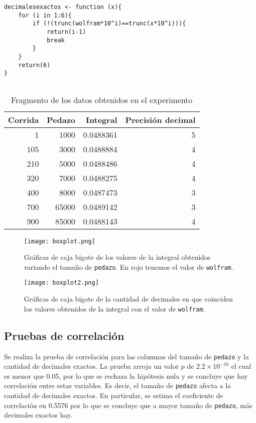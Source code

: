 \documentclass[12pt,letterpaper]{article}
\begin{document}
\begin{lstlisting}[label=lst:gc1,caption=Función \texttt{decimalesexactos}., frame = single]
decimalesexactos <- function (x){
    for (i in 1:6){
        if (!(trunc(wolfram*10^i)==trunc(x*10^i))){
            return(i-1)
            break
        } 
    }
    return(6)
}
    
\end{lstlisting} 

\begin{table}
\centering
\caption{Fragmento de los datos obtenidos en el experimento}
\begin{tabular}{rrrr}
  \hline
 Corrida & Pedazo & Integral & Precisión decimal  \\ 
  \hline
1 & 1000 & 0.0488361 & 5 \\ 
  105 & 3000 & 0.0488884 & 4 \\ 
  210 & 5000 & 0.0488486 & 4 \\ 
  320 & 7000 & 0.0488275 & 4 \\ 
  400 & 8000 & 0.0487473 & 3 \\ 
  700 & 65000 & 0.0489142 & 3 \\ 
  900 & 85000 & 0.0488143 & 4 \\ 
   \hline
\end{tabular}
\label{datos}
\end{table}
 
\begin{figure}
	\centering
	\texttt{[image: boxplot.png]}
	\caption{Gráficas de caja bigote de los valores de la integral obtenidos variando el tamaño de \texttt{pedazo}. En rojo tenemos el valor de \texttt{wolfram}.}
	\label{box1}
\end{figure}

\begin{figure}
	\centering
	\texttt{[image: boxplot2.png]}
	\caption{Gráficas de caja bigote de la cantidad de decimales en que coinciden los valores obtenidos de la integral con el valor de \texttt{wolfram}.}
	\label{box2}
\end{figure}
\subsection{Pruebas de correlación}
Se realiza la prueba de correlación para las columnas del tamaño de \texttt{pedazo} y la cantidad de decimales exactos. La prueba arroja un valor $p$ de $2.2\times 10^{-16}$ el cual es menor que 0.05, por lo que se rechaza la hipótesis nula y se concluye que hay correlación entre estas variables. Es decir, el tamaño de \texttt{pedazo} afecta a la cantidad de decimales exactos. En particular, se estima el coeficiente de correlación en 0.5576 por lo que se concluye que a mayor tamaño de \texttt{pedazo}, más decimales exactos hay.
\end{document}
